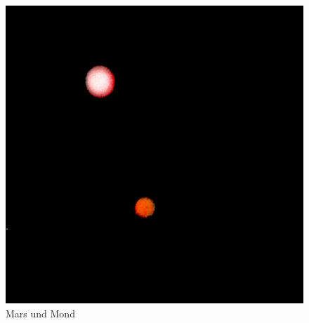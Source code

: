 \documentclass{scrartcl}
\begin{document}
\begin{figure}[hbt]
\includegraphics[height=.20\textheight]{Image}
\caption{Mars und Mond}
\label{bild1}
\end{figure}
\end{document}
